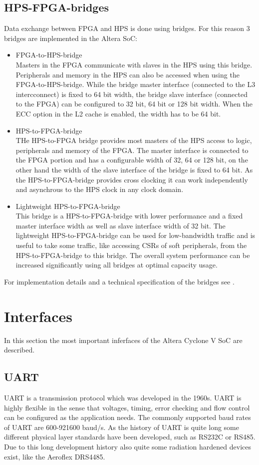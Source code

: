 \subsection{HPS-FPGA-bridges}
Data exchange between FPGA and HPS is done using bridges. For this reason 3 bridges are implemented in the Altera SoC:
\begin{itemize}
\item FPGA-to-HPS-bridge\\
Masters in the FPGA communicate with slaves in the HPS using this bridge. Peripherals and memory in the HPS can also be accessed when using the FPGA-to-HPS-bridge. While the bridge master interface (connected to the L3 intercconnect)  is fixed to 64 bit width, the bridge slave interface (connected to the FPGA) can be configured to 32 bit, 64 bit or 128 bit width. When the ECC option in the L2 cache is enabled, the width has to be 64 bit. 
\item HPS-to-FPGA-bridge\\
THe HPS-to-FPGA bridge provides most masters of the HPS access to logic, peripherals and memory of the FPGA. The master interface is connected to the FPGA portion and has a configurable width of 32, 64 or 128 bit, on the other hand the width of the slave interface of the bridge is fixed to 64 bit. As the HPS-to-FPGA-bridge provides cross clocking it can work independently and asynchrous to the HPS clock in any clock domain. 
\item Lightweight HPS-to-FPGA-bridge\\
This bridge is a HPS-to-FPGA-bridge with lower performance and a fixed master interface width as well as slave interface width of 32 bit. The lightweight HPS-to-FPGA-bridge can be used for low-bandwidth traffic and is useful to take some traffic, like accessing CSRs of soft peripherals, from the HPS-to-FPGA-bridge to this bridge. The overall system performance can be increased significantly using all bridges at optimal capacity usage.
\end{itemize}
For implementation details and a technical specification of the bridges see \cite[chapter 8]{AlteraHPS15}.
\section{Interfaces}
In this section the most important inferfaces of the Altera Cyclone V SoC are described.
\subsection{UART}
UART is a transmission protocol which was developed in the 1960s. UART is highly flexible in the sense that voltages, timing, error checking and flow control can be configured as the application needs. The commonly supported baud rates of UART are 600-921600 baud/s. As the history of UART is quite long some different physical layer standards have been developed, such as RS232C or RS485. Due to this long development history also quite some radiation hardened devices exist, like the Aeroflex DRS4485.\cite{aeroflex14}
